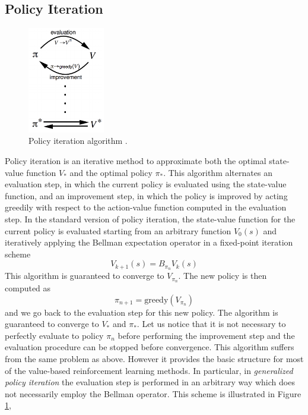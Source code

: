 \subsection{Policy Iteration}
\begin{figure}[t]
	\centering
	\includegraphics[width=0.3\textwidth]{Images/2_0_policy_iteration.png}
	\caption[Policy iteration algorithm]{Policy iteration algorithm \cite{sutton1998introduction}.}
	\label{fig:policy_iteration}
\end{figure}
Policy iteration is an iterative method to approximate both the optimal state-value function $V_*$ and the optimal policy $\pi_*$. This algorithm alternates an evaluation step, in which the current policy is evaluated using the state-value function, and an improvement step, in which the policy is improved by acting greedily with respect to the action-value function computed in the evaluation step. In the standard version of policy iteration, the state-value function for the current policy is evaluated starting from an arbitrary function $V_0(s)$ and iteratively applying the Bellman expectation operator in a fixed-point iteration scheme 
\begin{equation*}
	V_{k+1}(s) = B_{\pi_n} V_k(s)
\end{equation*}
This algorithm is guaranteed to converge to $V_{\pi_n}$. The new policy is then computed as 
\begin{equation*}
	\pi_{n+1} = \text{greedy}(V_{\pi_n})
\end{equation*}
and we go back to the evaluation step for this new policy. The algorithm is guaranteed to converge to $V_*$ and $\pi_*$. Let us notice that it is not necessary to perfectly evaluate to policy $\pi_n$ before performing the improvement step and the evaluation procedure can be stopped before convergence. This algorithm suffers from the same problem as above. However it provides the basic structure for most of the value-based reinforcement learning methods. In particular, in \emph{generalized policy iteration} the evaluation step is performed in an arbitrary way which does not necessarily employ the Bellman operator. This scheme is illustrated in Figure \ref{fig:policy_iteration},

  



